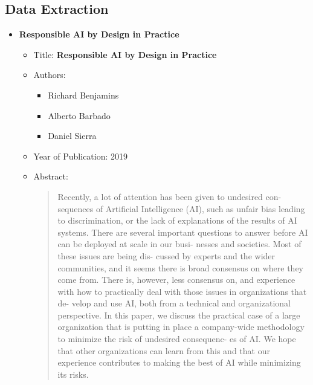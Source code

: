 \documentclass{article}
\begin{document}
    \subsection{Data Extraction}
    \begin{itemize}
        \item \textbf{Responsible AI by Design in Practice}
        \begin{itemize}
            \item Title: \textbf{Responsible AI by Design in Practice}
            \item Authors: 
            \begin{itemize}
                \item Richard Benjamins
                \item Alberto Barbado
                \item Daniel Sierra
            \end{itemize}
            \item Year of Publication: 2019
            \item Abstract:
            \begin{abstract}
                Recently, a lot of attention has been given to undesired con-
                sequences of Artificial Intelligence (AI), such as unfair bias 
                leading to discrimination, or the lack of explanations of the 
                results of AI systems. There are several important questions 
                to  answer  before  AI  can  be  deployed  at  scale  in  our  busi-
                nesses  and  societies.  Most  of  these  issues  are  being  dis-
                cussed  by  experts  and the  wider communities,  and  it  seems 
                there is broad consensus on where they come from. There is, 
                however,  less  consensus  on,  and  experience  with  how  to 
                practically  deal  with  those  issues  in  organizations  that  de-
                velop  and  use  AI,  both  from  a  technical  and  organizational 
                perspective. In this paper, we discuss the practical case of a 
                large  organization  that  is  putting  in  place  a  company-wide 
                methodology to minimize the risk of undesired consequenc-
                es  of  AI.  We  hope  that  other  organizations  can  learn  from 
                this  and  that  our  experience  contributes  to  making  the  best 
                of AI while minimizing its risks.
            \end{abstract}
        \end{itemize}
        

\end{itemize}
\end{document}
